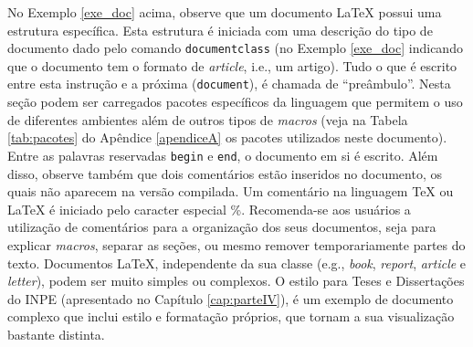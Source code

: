 
No Exemplo \ref{exe_doc} acima, observe que um documento \LaTeX{} possui uma estrutura específica. Esta estrutura é iniciada com uma descrição do tipo de documento dado pelo comando \texttt{documentclass} (no Exemplo \ref{exe_doc} indicando que o documento tem o formato de \textit{article}, i.e., um artigo). Tudo o que é escrito entre esta instrução e a próxima ({\tt document}), é chamada de ``preâmbulo''. Nesta seção podem ser carregados pacotes específicos da linguagem que permitem o uso de diferentes ambientes além de outros tipos de \textit{macros} (veja na Tabela \ref{tab:pacotes} do Apêndice \ref{apendiceA} os pacotes utilizados neste documento). Entre as palavras reservadas \texttt{begin} e \texttt{end}, o documento em si é escrito. Além disso, observe também que dois comentários estão inseridos no documento, os quais não aparecem na versão compilada. Um comentário na linguagem \TeX{} ou \LaTeX{} é iniciado pelo caracter especial \%. Recomenda-se aos usuários a utilização de comentários para a organização dos seus documentos, seja para explicar \textit{macros}, separar as seções, ou mesmo remover temporariamente partes do texto. Documentos \LaTeX{}, independente da sua classe (e.g., \textit{book}, \textit{report}, \textit{article} e \textit{letter}), podem ser muito simples ou complexos. O estilo para Teses e Dissertações do INPE (apresentado no Capítulo \ref{cap:parteIV}), é um exemplo de documento complexo que inclui estilo e formatação próprios, que tornam a sua visualização bastante distinta.

